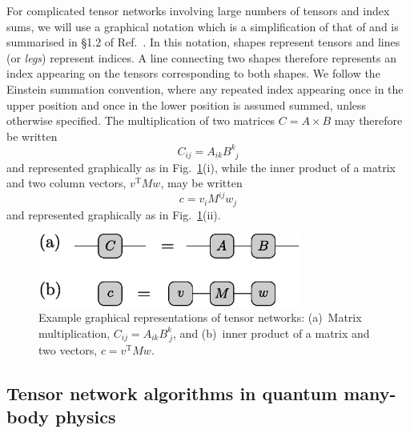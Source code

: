 \documentclass[aps,pre,reprint,superscriptaddress,amsfonts,amsmath,showpacs,nofootinbib,floatfix]{revtex4-1}
\newcommand{\mrm}[1]{\mathrm{#1}}
\newcommand{\fref}[1]{Fig.~\ref{#1}}
\newcommand{\p}[1]{\phantom{#1}}
\newcommand{\rcite}[1]{Ref.~\onlinecite{#1}}
\begin{document}
For complicated tensor networks involving large numbers of tensors and index sums, we will use a graphical notation which is a simplification of that of \citeauthor{penrose1971a} \cite{penrose1971a} and is summarised in \S{}1.2 of \rcite{pfeifer2011a}. In this notation, shapes represent tensors and lines (or \emph{legs}) represent indices. A line connecting two shapes therefore represents an index appearing on the tensors corresponding to both shapes. We follow the Einstein summation convention, where any repeated index appearing once in the upper position and once in the lower position is assumed summed, unless otherwise specified. The multiplication of two matrices $C=A\times B$ may therefore be written
\begin{equation}
C_{ij} = A_{ik}B^k_{\p{k}j}\label{eq:AtimesB}
\end{equation}
and represented graphically as in \fref{fig:examplenetworks}(i), while the inner product of a matrix and two column vectors, $v^\mrm{T}Mw$, may be written
\begin{equation}
c = v_i M^{ij} w_j\label{eq:vMw}
\end{equation}
and represented graphically as in \fref{fig:examplenetworks}(ii).
\begin{figure}
\includegraphics[width=246.0pt]{examplenetworks}
\caption{Example graphical representations of tensor networks: (a)~Matrix multiplication, $C_{ij}=A_{ik}B^k_{~j}$, and (b)~inner product of a matrix and two vectors, $c=v^\mrm{T}Mw$.\label{fig:examplenetworks}}
\end{figure}%


\subsection{Tensor network algorithms in quantum many-body physics\label{sec:TNAs}}
\end{document}
